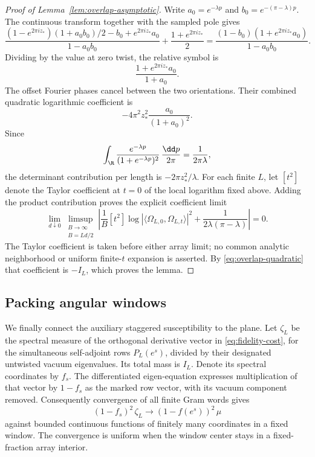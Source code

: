 \begin{proof}[Proof of Lemma~\ref{lem:overlap-asymptotic}]
Write \(a_0=e^{-\lambda p}\) and \(b_0=e^{-(\pi-\lambda)p}\).
The continuous transform together with the sampled pole gives
\[
 \frac{(1-e^{2\pi i z_*})(1+a_0b_0)/2-b_0
                              +e^{2\pi i z_*}a_0}
      {1-a_0b_0}
       +\frac{1+e^{2\pi i z_*}}2
 =\frac{(1-b_0)(1+e^{2\pi i z_*}a_0)}
        {1-a_0b_0}.
 \]
Dividing by the value at zero twist, the relative symbol is
\[
 \frac{1+e^{2\pi i z_*}a_0}{1+a_0}.
\]
The offset Fourier phases cancel between the two orientations.
Their combined quadratic logarithmic coefficient is
\[
 -4\pi^2 z_*^2\frac{a_0}{(1+a_0)^2}.
\]
Since
\[
 \int_{\R}\frac{e^{-\lambda p}}{(1+e^{-\lambda p})^2}\,
       \frac{\dd p}{2\pi}=\frac1{2\pi\lambda},
\]
the determinant contribution per length is \(-2\pi z_*^2/\lambda\).
For each finite \(L\), let \([t^2]\) denote the Taylor coefficient at
\(t=0\) of the local logarithm fixed above. Adding the product contribution
proves the explicit coefficient limit
\[
 \lim_{d\downarrow0}\limsup_{\substack{B\to\infty\\ B=Ld/2}}
 \left|\frac1B[t^2]\log|\langle\Omega_{L,0},\Omega_{L,t}\rangle|^2
       +\frac1{2\lambda(\pi-\lambda)}\right|=0.
\]
The Taylor coefficient is taken before either array limit; no common
analytic neighborhood or uniform finite-\(t\) expansion is asserted.
By \eqref{eq:overlap-quadratic} that coefficient is \(-I_L\), which
proves the lemma.
\end{proof}

\subsection{Packing angular windows}

We finally connect the auxiliary staggered susceptibility to the plane.
Let \(\zeta_L\) be the spectral measure of the orthogonal derivative vector
in \eqref{eq:fidelity-cost}, for the simultaneous self-adjoint rows
\(P_L(e^s)\), divided by their designated untwisted vacuum eigenvalues.
Its total mass is \(I_L\). Denote its spectral coordinates by \(f_s\).
The differentiated eigen-equation expresses multiplication of that vector
by \(1-f_s\) as the marked row vector, with its vacuum component removed.
Consequently convergence of all finite Gram words gives
\begin{equation}\label{eq:weighted-measure-convergence}
 (1-f_s)^2\,\zeta_L
       \longrightarrow (1-f(e^s))^2\,\mu
\end{equation}
against bounded continuous functions of finitely many coordinates in a
fixed window. The convergence is uniform when the window center stays
in a fixed-fraction array interior.

